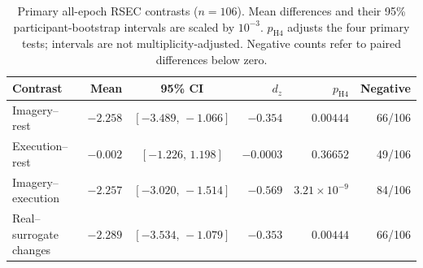 \begin{table}[!t]
\centering
\caption{Primary all-epoch RSEC contrasts ($n=106$). Mean differences and their 95\% participant-bootstrap intervals are scaled by $10^{-3}$. $p_{\mathrm{H4}}$ adjusts the four primary tests; intervals are not multiplicity-adjusted. Negative counts refer to paired differences below zero.}
\label{tab:global_results}
\small
\setlength{\tabcolsep}{5pt}
\renewcommand{\arraystretch}{1.15}
\begin{tabular}{|l|r|c|r|r|r|}
\hline
\rowcolor{light-gray}
\textbf{Contrast} & \textbf{Mean} & \textbf{95\% CI} & $d_z$ & $p_{\mathrm{H4}}$ & \textbf{Negative} \\ \hline
Imagery--rest & $-2.258$ & $[-3.489,\,-1.066]$ & $-0.354$ & $0.00444$ & 66/106 \\ \hline
Execution--rest & $-0.002$ & $[-1.226,\,1.198]$ & $-0.0003$ & $0.36652$ & 49/106 \\ \hline
Imagery--execution & $-2.257$ & $[-3.020,\,-1.514]$ & $-0.569$ & $3.21\times10^{-9}$ & 84/106 \\ \hline
Real--surrogate changes & $-2.289$ & $[-3.534,\,-1.079]$ & $-0.353$ & $0.00444$ & 66/106 \\ \hline
\end{tabular}
\end{table}
